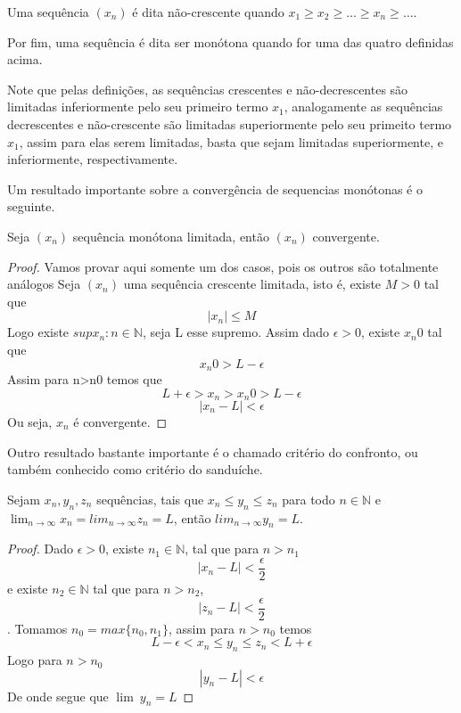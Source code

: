 Uma sequência $(x_n)$ é dita não-crescente quando $x_1 \geq x_2 \geq \dots 
\geq x_n \geq \dots$.

Por fim, uma sequência é dita ser monótona quando for uma das quatro definidas 
acima.

Note que pelas definições, as sequências crescentes e não-decrescentes são 
limitadas inferiormente pelo seu primeiro termo $x_1$, analogamente as sequências
decrescentes e não-crescente são limitadas superiormente pelo seu primeito termo 
$x_1$, assim para elas serem limitadas, basta que sejam limitadas superiormente,
e inferiormente, respectivamente.

Um resultado importante sobre a convergência de sequencias monótonas é o seguinte.

\begin{teo}\label{monótona}
    Seja $(x_n)$ sequência monótona limitada, então $(x_n)$ convergente.
\end{teo}

\begin{proof}
    Vamos provar aqui somente um dos casos, pois os outros são totalmente análogos
    Seja $(x_n)$ uma sequência crescente limitada, isto é, existe $M>0$ tal que
    $$|x_n| \leq M $$ 
    Logo existe $sup{x_n: n \in \mathbb{N}}$, seja L esse supremo.
    Assim dado $\epsilon > 0$, existe $x_n0$ tal que
    $$ x_n0 > L - \epsilon $$
    Assim para n>n0 temos que
    $$L + \epsilon > x_n > x_n0 > L - \epsilon$$
    $$|x_n - L| < \epsilon $$
    Ou seja, $x_n$ é convergente.
\end{proof}

Outro resultado bastante importante é o chamado critério do confronto, ou também 
conhecido como critério do sanduíche.

\begin{teo}
    Sejam $x_n,y_n,z_n$ sequências, tais que $x_n \leq y_n \leq z_n$ para todo 
    $n \in \mathbb{N}$ e $\lim_{n \to \infty} x_n = lim_{n \to \infty} z_n = L$,
    então $lim_{n \to \infty} y_n = L$.
\end{teo}

\begin{proof}
    Dado $\epsilon > 0$, existe $n_1 \in \mathbb{N}$, tal que para $n>n_1$
    $$|x_n - L| < \frac{\epsilon}{2}$$
    e existe $n_2 \in \mathbb{N}$ tal que para $n>n_2$,
    $$|z_n - L| < \frac{\epsilon}{2} $$.
    Tomamos $n_0 = max\{n_0,n_1 \}$, assim para $n > n_0$ temos
    $$L - \epsilon < x_n \leq y_n \leq z_n < L + \epsilon$$
    Logo para $n > n_0$
    $$ |y_n - L| < \epsilon$$
    De onde segue que $\lim{\:} y_n = L$
\end{proof}

